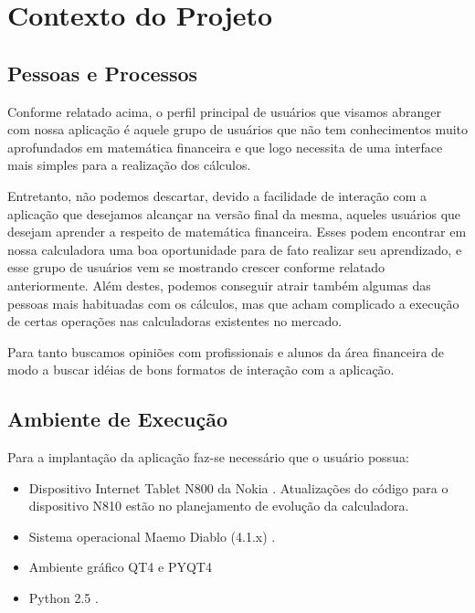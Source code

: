 \section{Contexto do Projeto}

\subsection{Pessoas e Processos}

Conforme relatado acima, o perfil principal de usuários que visamos abranger com nossa aplicação é aquele grupo de usuários que não tem conhecimentos muito aprofundados em matemática financeira e que logo necessita de uma interface mais simples para a realização dos cálculos.

Entretanto, não podemos descartar, devido a facilidade de interação com a aplicação que desejamos alcançar na versão final da mesma, aqueles usuários que desejam aprender a respeito de matemática financeira. Esses podem encontrar em nossa calculadora uma boa oportunidade para de fato realizar seu aprendizado, e esse grupo de usuários vem se mostrando crescer conforme relatado anteriormente. Além destes, podemos conseguir atrair também algumas das pessoas mais habituadas com os cálculos, mas que acham complicado a execução de certas operações nas calculadoras existentes no mercado.

Para tanto buscamos opiniões com profissionais e alunos da área financeira de modo a buscar idéias de bons formatos de interação com a aplicação.


\subsection{Ambiente de Execução}


Para a implantação da aplicação faz-se necessário que o usuário possua:

\begin{itemize}
 \item Dispositivo Internet Tablet N800 da Nokia \cite{n800}. Atualizações do código para o dispositivo N810 estão no planejamento de evolução da calculadora.
 \item Sistema operacional Maemo Diablo (4.1.x) \cite{diablo}.
 \item Ambiente gráfico QT4 \cite{qt4} e PYQT4 \cite{pyqt4}
 \item Python 2.5 \cite{python}.
\end{itemize}

